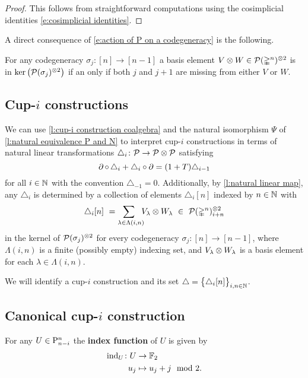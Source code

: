 \begin{proof}
	This follows from straightforward computations using the cosimplicial identities \eqref{e:cosimplicial identities}.
\end{proof}

A direct consequence of \cref{e:action of P on a codegeneracy} is the following.

\begin{lemma} \label{l:kernel of sxs}
	For any codegeneracy $\sigma_j \colon [n] \to [n-1]$ a basis element $V \otimes W \in \mathcal{P}(\mathbb{\Delta}^n)^{\otimes 2}$ is in $\ker \big( \mathcal{P}(\sigma_j)^{\otimes 2} \big)$ if an only if both $j$ and $j+1$ are missing from either $V$ or $W$.
\end{lemma}

\subsection{Cup-$i$ constructions}

We can use \cref{l:cup-i construction coalgebra} and the natural isomorphism $\Psi$ of \cref{l:natural equivalence P and N} to interpret cup-$i$ constructions in terms of natural linear transformations $\triangle_i \colon \mathcal{P} \to \mathcal{P} \otimes \mathcal{P}$ satisfying
\[
\operatorname{\partial} \circ \, \triangle_i + \triangle_i \circ \operatorname{\partial} =
(1+T) \triangle_{i-1}
\]
for all $i \in \mathbb{N}$ with the convention $\triangle_{-1} = 0$.
Additionally, by \cref{l:natural linear map}, any $\triangle_i$ is determined by a collection of elements $\triangle_i [n]$ indexed by $n \in \mathbb{N}$ with
\[
\triangle_i [n] \ =
\sum_{\lambda \in \Lambda(i,n) \kern-5pt} V_\lambda \otimes W_\lambda \ \in \
\mathcal{P}(\mathbb{\Delta}^n)^{\otimes 2}_{i+n}
\]
in the kernel of $\mathcal{P}(\sigma_j)^{\otimes 2}$ for every codegeneracy $\sigma_j \colon [n] \to [n-1]$,
where $\Lambda(i,n)$ is a finite (possibly empty) indexing set, and $V_\lambda \otimes W_\lambda$ is a basis element for each $\lambda \in \Lambda(i,n)$.

We will identify a cup-$i$ construction and its set $\triangle = \big\{ \triangle_i [n] \big\}_{i,n \in \mathbb{N}}$.

\subsection{Canonical cup-$i$ construction}

\begin{definition}
	For any $U \in \mathrm{P}^n_{n-i}$ the \textbf{index function} of $U$ is given by
	\[
	\begin{split}
	\operatorname{ind}_U \colon U &\to {\mathbb{F}_2} \\
	u_j &\mapsto u_j + j \mod 2.
	\end{split}
	\]
\end{definition}

